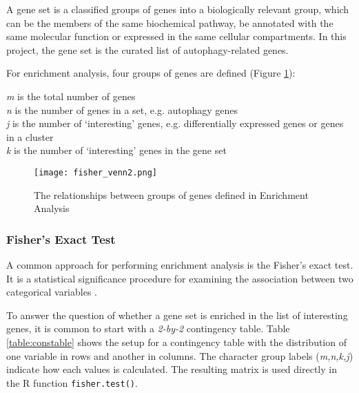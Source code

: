         A gene set is a classified groups of genes into a biologically relevant group, which can be the members of the same biochemical pathway, be annotated with the same molecular function or expressed in the same cellular compartments. In this project, the gene set is the curated list of autophagy-related genes. 
        
        For enrichment analysis, four groups of genes are defined (Figure \ref{fig:fishervenn}):
        
        \begin{itemize}
        \textit{m} is the total number of genes\\
        \textit{n} is the number of genes in a set, e.g. autophagy genes\\
        \textit{j}  is the number of ‘interesting’ genes, e.g. differentially expressed genes or genes in a cluster\\
        \textit{k} is the number of ‘interesting’ genes in the gene set\\
        \end{itemize}
        
                    \begin{figure}[!h]
                    \centering
                   \texttt{[image: fisher\_venn2.png]}
                    \caption{The relationships between groups of genes defined in Enrichment Analysis}
                    \label{fig:fishervenn}
                    \end{figure}
                    
        \subsubsection{Fisher's Exact Test}
        
        A common approach for performing enrichment analysis is the Fisher’s exact test. It is a statistical significance procedure for examining the association between two categorical variables \cite{Fishersexacttest}. 
        
        To answer the question of whether a gene set is enriched in the list of interesting genes, it is common to start with a \textit{2-by-2} contingency table. Table \ref{table:constable} shows the setup for a contingency table with the distribution of one variable in rows and another in columns. The character group labels (\textit{m,n,k,j}) indicate how each values is calculated. The resulting matrix is used directly in the R function \texttt{fisher.test()}. 
        
